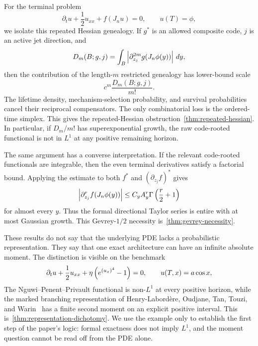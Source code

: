 For the terminal problem
\begin{equation}
  \partial_tu+\frac12u_{xx}+f(J_nu)=0,
  \qquad
  u(T)=\phi,
  \label{eq:intro-general-pde}
\end{equation}
we isolate this repeated Hessian genealogy. If $g^*$ is an allowed composite code, $j$ is an active jet direction, and
\begin{equation*}
  D_m(B;g,j)
  =
  \int_B
  \left|\partial_{z_j}^{2m}g(J_n\phi(y))\right|\,dy,
\end{equation*}
then the contribution of the length-$m$ restricted genealogy has lower-bound scale
\begin{equation*}
  c^m\frac{D_m(B;g,j)}{m!}.
\end{equation*}
The lifetime density, mechanism-selection probability, and survival probabilities cancel their reciprocal compensators. The only combinatorial loss is the ordered-time simplex. This gives the repeated-Hessian obstruction~\cref{thm:repeated-hessian}. In particular, if $D_m/m!$ has superexponential growth, the raw code-rooted functional is not in $L^1$ at any positive remaining horizon.

The same argument has a converse interpretation. If the relevant code-rooted functionals are integrable, then the even terminal derivatives satisfy a factorial bound. Applying the estimate to both $f^*$ and $(\partial_{z_j}f)^*$ gives
\begin{equation*}
  \left|\partial_{z_j}^r f(J_n\phi(y))\right|
  \leq
  C_yA_y^r\Gamma\left(\frac r2+1\right)
\end{equation*}
for almost every $y$. Thus the formal directional Taylor series is entire with at most Gaussian growth. This Gevrey-$1/2$ necessity is~\cref{thm:gevrey-necessity}.

These results do not say that the underlying PDE lacks a probabilistic representation. They say that one exact architecture can have an infinite absolute moment. The distinction is visible on the benchmark
\begin{equation}
  \partial_tu+\frac12u_{xx}
  +\eta\left(e^{(u_x)^4}-1\right)=0,
  \qquad
  u(T,x)=a\cos x,
  \label{eq:intro-benchmark}
\end{equation}
The Nguwi--Penent--Privault functional is non-$L^1$ at every positive horizon, while the marked branching representation of Henry-Labord\`ere, Oudjane, Tan, Touzi, and Warin~\cite{HenryLabordereEtAl2019} has a finite second moment on an explicit positive interval. This is~\cref{thm:representation-dichotomy}. We use the example only to establish the first step of the paper's logic: formal exactness does not imply $L^1$, and the moment question cannot be read off from the PDE alone.

